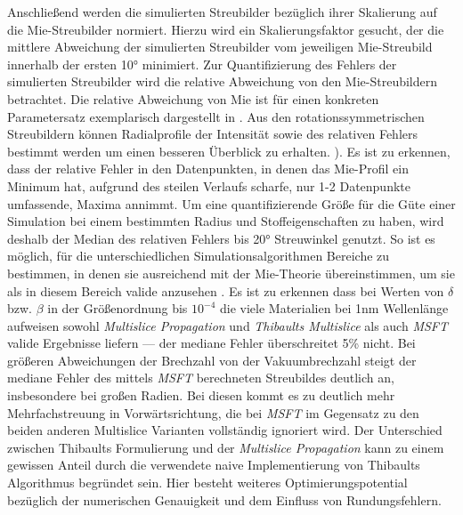 Anschließend werden die simulierten Streubilder bezüglich ihrer Skalierung auf die Mie-Streubilder normiert. Hierzu wird ein Skalierungsfaktor gesucht, der die mittlere Abweichung der simulierten Streubilder vom jeweiligen Mie-Streubild innerhalb der ersten 10° minimiert. Zur Quantifizierung des Fehlers der simulierten Streubilder wird die relative Abweichung von den Mie-Streubildern betrachtet.
Die relative Abweichung von Mie ist für einen konkreten Parametersatz exemplarisch dargestellt in . Aus den rotationssymmetrischen Streubildern können Radialprofile der Intensität sowie des relativen Fehlers bestimmt werden um einen besseren Überblick zu erhalten. ).
Es ist zu erkennen, dass der relative Fehler in den Datenpunkten, in denen das Mie-Profil ein Minimum hat, aufgrund des steilen Verlaufs scharfe, nur 1-2 Datenpunkte umfassende, Maxima annimmt.
Um eine quantifizierende Größe für die Güte einer Simulation bei einem bestimmten Radius und Stoffeigenschaften zu haben, wird deshalb der Median des relativen Fehlers bis 20° Streuwinkel genutzt. So ist es möglich, für die unterschiedlichen Simulationsalgorithmen Bereiche zu bestimmen, in denen sie ausreichend mit der Mie-Theorie übereinstimmen, um sie als in diesem Bereich valide anzusehen . Es ist zu erkennen dass bei Werten von $\delta$ bzw. $\beta$ in der Größenordnung bis $10^{-4}$ die viele Materialien bei 1\si{nm} Wellenlänge aufweisen \cite{henke} sowohl \textit{Multislice Propagation} und\textit{ Thibaults Multislice} als auch \textit{MSFT} valide Ergebnisse liefern --- der mediane Fehler überschreitet 5\% nicht. Bei größeren Abweichungen der Brechzahl von der Vakuumbrechzahl steigt der mediane Fehler des mittels \textit{MSFT} berechneten Streubildes deutlich an, insbesondere bei großen Radien. Bei diesen kommt es zu deutlich mehr Mehrfachstreuung in Vorwärtsrichtung, die bei \textit{MSFT} im Gegensatz zu den beiden anderen Multislice Varianten vollständig ignoriert wird. Der Unterschied zwischen Thibaults Formulierung und der \textit{Multislice Propagation} kann zu einem gewissen Anteil durch die verwendete naive Implementierung von Thibaults Algorithmus begründet sein. Hier besteht weiteres Optimierungspotential bezüglich der numerischen Genauigkeit und dem Einfluss von Rundungsfehlern.


